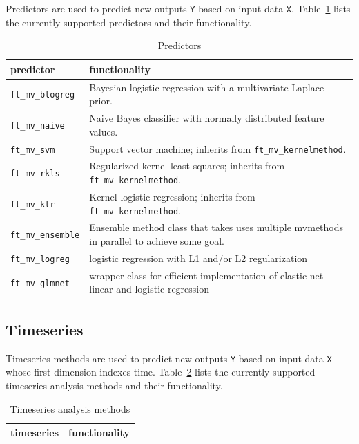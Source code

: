 \documentclass{article}
\renewcommand{\t}[1]{{\tt #1}}
\begin{document}
Predictors are used to predict new outputs \t{Y} based on input data \t{X}. Table~\ref{predictors} lists the currently supported predictors and their functionality.

\begin{table}[ht]
\centering
\caption{Predictors}
\begin{tabular}{p{}|p{}}
\bf{predictor} & \bf{functionality}\\
\hline
\t{ft\_mv\_blogreg} & Bayesian logistic regression with a multivariate Laplace prior.\\
\t{ft\_mv\_naive} & Naive Bayes classifier with normally distributed feature values.\\
\t{ft\_mv\_svm} & Support vector machine; inherits from \t{ft\_mv\_kernelmethod}.\\
\t{ft\_mv\_rkls} & Regularized kernel least squares; inherits from \t{ft\_mv\_kernelmethod}.\\
\t{ft\_mv\_klr}  &  Kernel logistic regression;  inherits from \t{ft\_mv\_kernelmethod}.\\
\t{ft\_mv\_ensemble} & Ensemble method class that takes uses multiple mvmethods in parallel to achieve some goal.\\
\t{ft\_mv\_logreg} & logistic regression with L1 and/or L2 regularization\\
\t{ft\_mv\_glmnet} & wrapper class for efficient implementation of elastic net linear and logistic regression
\end{tabular}
\label{predictors}
\end{table}

\subsection{Timeseries}

Timeseries methods are used to predict new outputs \t{Y} based on input data \t{X} whose first dimension indexes time. Table~\ref{timeseries} lists the currently supported timeseries analysis methods and their functionality.

\begin{table}[ht]
\centering
\caption{Timeseries analysis methods}
\begin{tabular}{p{}|p{}}
\bf{timeseries} & \bf{functionality}\\
\hline
\end{tabular}
\label{timeseries}
\end{table}
\end{document}
